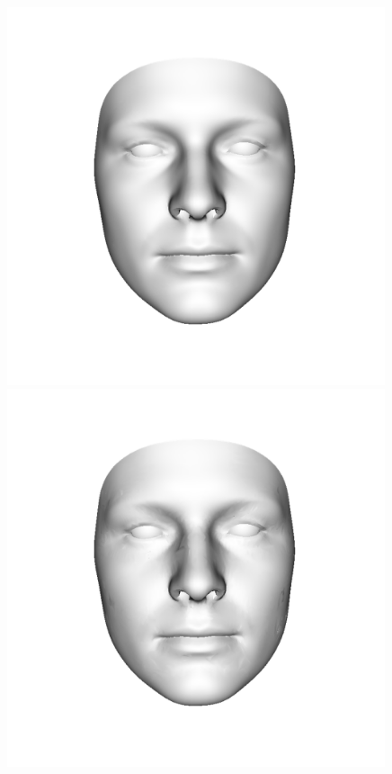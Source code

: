 \begin{figure}[h]
  \centering  
  \begin{minipage}{.325\textwidth}
    \centering
    \includegraphics[width=0.99\textwidth]{Figures/Pictures/d01a_t.png}
  \end{minipage}
  \begin{minipage}{.325\textwidth}
    \centering
    \includegraphics[width=0.99\textwidth]{Figures/Pictures/d06a_t.png}

\end{minipage}
\end{figure}
